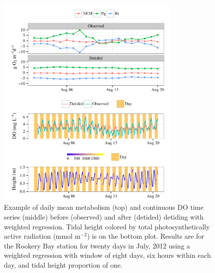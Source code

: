 \documentclass[letterpaper,12pt,oneside]{article}\usepackage[]{graphicx}\usepackage[]{color}
\newenvironment{knitrout}{}{} %
\begin{document}
\centering\vspace*{\fill}
\begin{knitrout}
\color{fgcolor}\begin{figure}[!ht]


{\centering \includegraphics[width=0.8\textwidth]{figure/case_ex1} 

}

\caption[Example of daily mean metabolism (top) and continuous \ac{DO} time series (middle) before (observed) and after (detided) detiding with weighted regression]{Example of daily mean metabolism (top) and continuous \ac{DO} time series (middle) before (observed) and after (detided) detiding with weighted regression. Tidal height colored by total photosynthetically active radiation (mmol m$^{-2}$) is on the bottom plot. Results are for the Rookery Bay station for twenty days in July, 2012 using a weighted regression with window of eight days, six hours within each day, and tidal height proportion of one.\label{fig:case_ex1}}
\end{figure}


\end{knitrout}
\vfill
\clearpage
\end{document}
